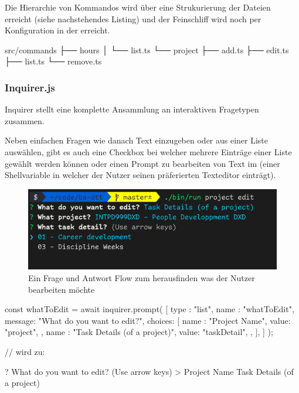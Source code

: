 \documentclass[oneside,bibliography=totocnumbered,BCOR=5mm]{scrbook}
\newenvironment{code}{\captionsetup{type=listing, skip=0pt}}{}
\begin{document}
Die Hierarchie von Kommandos wird über eine Strukurierung der Dateien erreicht (siehe nachstehendes Listing) und der Feinschliff wird noch per Konfiguration in der  erreicht.

\begin{code}
  \begin{shellcode}
 src/commands
 ├── hours
 │   └── list.ts
 └── project
     ├── add.ts
     ├── edit.ts
     ├── list.ts
     └── remove.ts
  \end{shellcode}
  \medskip
\end{code}


\subsubsection{Inquirer.js}

Inquirer stellt eine komplette Ansammlung an interaktiven %
Fragetypen zusammen.

Neben einfachen Fragen wie danach Text einzugeben oder aus einer Liste
auswählen, gibt es auch eine Checkbox bei welcher mehrere Einträge einer
Liste gewählt werden können oder einen Prompt zu bearbeiten von Text im
 (einer Shellvariable in welcher der Nutzer seinen
präferierten Texteditor einträgt).

\begin{figure}
  \centering
  \includegraphics[scale=0.5]{inquirer-example.png}
  \caption{Ein Frage und Antwort Flow zum herausfinden was der Nutzer bearbeiten möchte}
  \label{fig:inquirer-example}
\end{figure}

\begin{code}
  \medskip
  \begin{javascriptcode}
const { whatToEdit } = await inquirer.prompt( [ {
  type   : "list",
  name   : "whatToEdit",
  message: "What do you want to edit?",
  choices: [
    {
      name : "Project Name",
      value: "project",
    },
    {
      name : "Task Details (of a project)",
      value: "taskDetail",
    },
  ],
} ] );

// wird zu:

? What do you want to edit? (Use arrow keys)
> Project Name
  Task Details (of a project)
  \end{javascriptcode}
\end{code}
\end{document}
